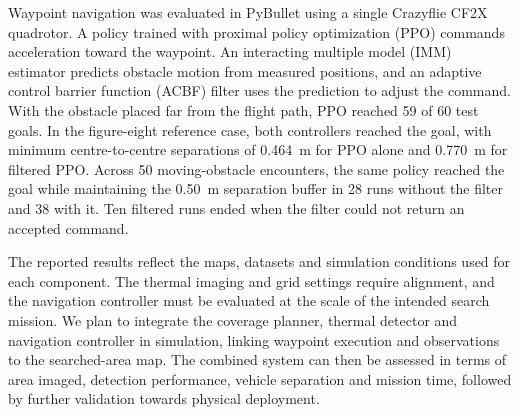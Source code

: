 \documentclass[11pt,a4paper]{article}
\begin{document}
Waypoint navigation was evaluated in PyBullet using a single Crazyflie CF2X quadrotor. A policy trained with proximal policy optimization (PPO) commands acceleration toward the waypoint. An interacting multiple model (IMM) estimator predicts obstacle motion from measured positions, and an adaptive control barrier function (ACBF) filter uses the prediction to adjust the command. With the obstacle placed far from the flight path, PPO reached 59 of 60 test goals. In the figure-eight reference case, both controllers reached the goal, with minimum centre-to-centre separations of 0.464~m for PPO alone and 0.770~m for filtered PPO. Across 50 moving-obstacle encounters, the same policy reached the goal while maintaining the 0.50~m separation buffer in 28 runs without the filter and 38 with it. Ten filtered runs ended when the filter could not return an accepted command.

The reported results reflect the maps, datasets and simulation conditions used for each component. The thermal imaging and grid settings require alignment, and the navigation controller must be evaluated at the scale of the intended search mission. We plan to integrate the coverage planner, thermal detector and navigation controller in simulation, linking waypoint execution and observations to the searched-area map. The combined system can then be assessed in terms of area imaged, detection performance, vehicle separation and mission time, followed by further validation towards physical deployment.

\end{document}
